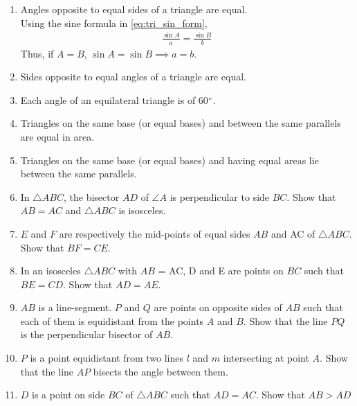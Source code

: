 \renewcommand{\theequation}{\theenumi}
\begin{enumerate}[label=\arabic*.,ref=\thesubsection.\theenumi]
\item Angles opposite to equal sides of a triangle are equal. 
\label{prob:tri_ang_side_eq}
\\
\solution Using the sine formula in \eqref{eq:tri_sin_form},%
\begin{align}
\frac{\sin A}{a} = \frac{\sin B}{b}
\end{align}
%
Thus, if $A=B$, $\sin A = \sin B \implies a =b$.
\item  Sides opposite to equal angles of a triangle are equal. 
%
\item  Each angle of an equilateral triangle is of 60$\degree$. 
%


\item Triangles on the same base (or equal bases) and between the same parallels are equal in area.
\item Triangles on the same base (or equal bases) and having equal areas lie between the same parallels.
\item In $\triangle ABC$, the bisector $AD$ of $\angle  A$ is perpendicular to side $BC$. Show that $AB = AC$ and $\triangle ABC$ is isosceles.
\item $E$ and $F$ are respectively the mid-points of equal sides $AB$ and AC of $\triangle ABC$. Show that $BF = CE$. 
\item In an isosceles $\triangle ABC$ with $AB$ = AC, D and E are points on $BC$ such that $BE = CD$. Show that $AD = AE$. 
%
\item $AB$ is a line-segment. $P$ and $Q$ are points on opposite sides of $AB$ such that each of them is equidistant from the points $A$ and $B$. Show that the line $PQ $ is the perpendicular bisector of $AB$.
%
\item $P$ is a point equidistant from two lines $l$ and $m$ intersecting at point $A$.  Show that the line  $AP$  bisects the angle between them.
%
\item $D$ is a point on side $BC$ of $\triangle  ABC$ such that $AD = AC$. Show that $AB > AD$


\end{enumerate}
